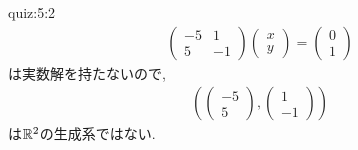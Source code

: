 \begin{answerof}{quiz:5:2}
\begin{align*}
\begin{pmatrix}
      -5&1\\5&-1
    \end{pmatrix}
    \begin{pmatrix}
      x\\y
    \end{pmatrix}=
    \begin{pmatrix}0\\1\end{pmatrix}
  \end{align*}
  は実数解を持たないので,
  \begin{align*}
    (\begin{pmatrix}-5\\5\end{pmatrix},\begin{pmatrix}1\\-1\end{pmatrix})
  \end{align*}
  は$\mathbb{R}^2$の生成系ではない.
\end{answerof}


